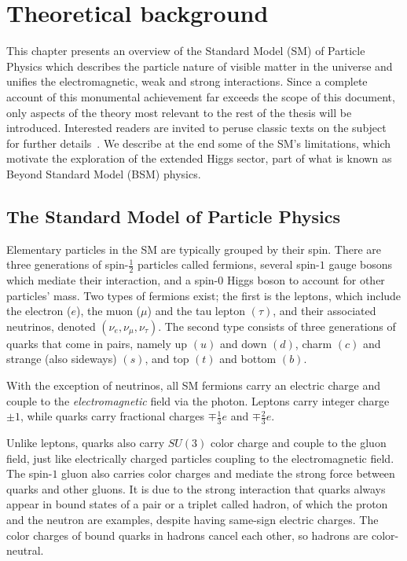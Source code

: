 \chapter{Theoretical background}
\label{chap:theory}

This chapter presents an overview of the Standard Model \cite{GLASHOW1961579,PhysRevLett.19.1264,Salam:1968rm} (SM) of Particle Physics which describes the particle nature of visible matter in the universe and unifies the electromagnetic, weak and strong interactions. 
Since a complete account of this monumental achievement far exceeds the scope of this document, only aspects of the theory most relevant to the rest of the thesis will be introduced. 
Interested readers are invited to peruse classic texts on the subject for further details~\cite{Peskin_2018, Halzen_Martin_2016, Schwartz_2014}.
We describe at the end some of the SM's limitations, which motivate the exploration of the extended Higgs sector, part of what is known as Beyond Standard Model (BSM) physics.

\section{The Standard Model of Particle Physics}

Elementary particles in the SM are typically grouped by their spin. 
There are three generations of spin-$\frac{1}{2}$ particles called fermions, several spin-$1$ gauge bosons which mediate their interaction, and a spin-$0$ Higgs boson to account for other particles' mass. 
Two types of fermions exist; the first is the leptons, which include the electron ($e$), the muon ($\mu$) and the tau lepton $(\tau)$, and their associated neutrinos, denoted $(\nu_e, \nu_{\mu}, \nu_{\tau})$. 
The second type consists of three generations of quarks that come in pairs, namely up $(u)$ and down $(d)$, charm $(c)$ and strange (also sideways) $(s)$, and top $(t)$ and bottom $(b)$. 

With the exception of neutrinos, all SM fermions carry an electric charge and couple to the \textit{electromagnetic} field via the photon. Leptons carry integer charge $\pm1$, while quarks carry fractional charges $\mp\frac{1}{3}e$ and $\mp\frac{2}{3}e$. 

Unlike leptons, quarks also carry $SU(3)$ color charge and couple to the gluon field, just like electrically charged particles coupling to the electromagnetic field. 
The spin-$1$ gluon also carries color charges and mediate the strong force between quarks and other gluons. 
It is due to the strong interaction that quarks always appear in bound states of a pair or a triplet called hadron, of which the proton and the neutron are examples, despite having same-sign electric charges. 
The color charges of bound quarks in hadrons cancel each other, so hadrons are color-neutral. 

